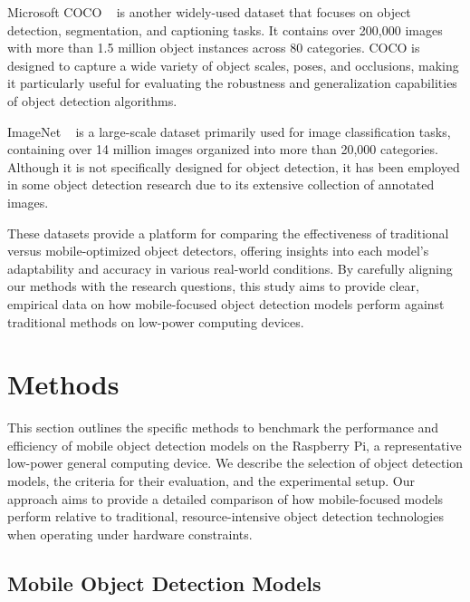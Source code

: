 \documentclass[10pt,twocolumn,letterpaper]{article}
\begin{document}
Microsoft COCO ~\cite{lin2015microsoft} is another widely-used dataset that focuses on object detection, segmentation, and captioning tasks.
It contains over 200,000 images with more than 1.5 million object instances across 80 categories.
COCO is designed to capture a wide variety of object scales, poses, and occlusions, making it particularly useful for evaluating the robustness and generalization capabilities of object detection algorithms.

ImageNet ~\cite{imagenet} is a large-scale dataset primarily used for image classification tasks, containing over 14 million images organized into more than 20,000 categories.
Although it is not specifically designed for object detection, it has been employed in some object detection research due to its extensive collection of annotated images.

These datasets provide a platform for comparing the effectiveness of traditional versus mobile-optimized object detectors, offering insights into each model's adaptability and accuracy in various real-world conditions.
By carefully aligning our methods with the research questions, this study aims to provide clear, empirical data on how mobile-focused object detection models perform against traditional methods on low-power computing devices. 
\section{Methods}
\label{sec:methods}

This section outlines the specific methods to benchmark the performance and efficiency of mobile object detection models on the Raspberry Pi, a representative low-power general computing device. We describe the selection of object detection models, the criteria for their evaluation, and the experimental setup. Our approach aims to provide a detailed comparison of how mobile-focused models perform relative to traditional, resource-intensive object detection technologies when operating under hardware constraints.


\subsection{Mobile Object Detection Models}
\label{subsec:MobileObjectDetectionModels}
\end{document}
